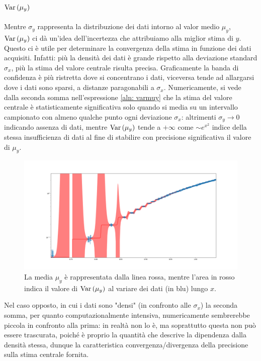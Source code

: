 \documentclass{article}[a4paper, oneside, 11pt]
\begin{document}
\subsection{$\text{Var}\left(\mu_y\right)$}
Mentre $\sigma_y$ rappresenta la distribuzione dei dati intorno al valor medio 
$\mu_y$, $\text{Var}\left(\mu_y\right)$ ci dà un'idea dell’incertezza che attribuiamo alla
miglior stima di $y$. Questo ci è utile per determinare la convergenza della
stima in funzione dei dati acquisiti.
Infatti: più la densità dei dati è grande rispetto alla deviazione standard
$\sigma_x$, più la stima del valore centrale risulta precisa. Graficamente
la banda di confidenza è più ristretta dove si concentrano i dati, viceversa
tende ad allargarsi dove i dati sono sparsi, a distanze paragonabili a
$\sigma_x$. Numericamente, si vede dalla seconda somma nell'espressione
\eqref{aln: varmuy} che la stima del valore centrale è statisticamente
significativa solo quando si media su un intervallo campionato con almeno
qualche punto ogni deviazione $\sigma_x$: altrimenti $\sigma_y \to 0$
indicando assenza di dati, mentre $\text{Var}\left(\mu_y\right)$ tende a $+\infty$ come
$\sim e^{x^2}$ indice della stessa insufficienza di dati al fine di stabilire
con precisione significativa il valore di $\mu_y$.
\begin{figure}[!htbp]
	\centering 
 		\includegraphics[scale=0.32]{./varmuy.png}
 	\caption{La media $\mu_y$ è rappresentata dalla linea rossa, mentre
	l'area in rosso indica il valore di $\text{Var}\left(\mu_y\right)$ al variare dei
	dati (in blu) lungo $x$. \label{fig: varmuy}}
\end{figure}
Nel caso opposto, in cui i dati sono "densi" (in confronto alle $\sigma_x$)
la seconda somma, per quanto computazionalmente intensiva, numericamente
sembrerebbe piccola in confronto alla prima: in realtà non lo è, ma
soprattutto questa non può essere trascurata, poiché è proprio la quantità
che descrive la dipendenza dalla densità stessa, dunque la caratteristica
convergenza/divergenza della precisione sulla stima centrale fornita.
\end{document}
